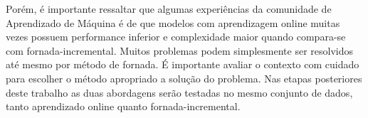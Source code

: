 Porém, é importante ressaltar que algumas experiências da comunidade de Aprendizado de Máquina é de que modelos com aprendizagem online muitas vezes possuem performance inferior e complexidade maior quando compara-se com fornada-incremental. Muitos problemas podem simplesmente ser resolvidos até mesmo por método de fornada. É importante avaliar o contexto com cuidado para escolher o método apropriado a solução do problema. Nas etapas posteriores deste trabalho as duas abordagens serão testadas no mesmo conjunto de dados, tanto aprendizado online quanto fornada-incremental.




 


